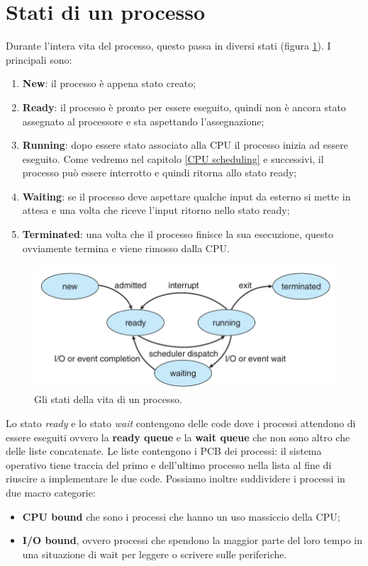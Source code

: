 \section{Stati di un processo}
Durante l'intera vita del processo, questo passa in diversi stati (figura \ref{fig:process_life}). I principali sono:
\vspace{-5px}
\begin{enumerate}
\setlength{\itemsep}{-.15 em}
    \item \textbf{New}: il processo è appena stato creato;
    \item  \textbf{Ready}: il processo è pronto per essere eseguito, quindi non è ancora stato assegnato al processore e sta aspettando l'assegnazione;
    \item \textbf{Running}: dopo essere stato associato alla CPU il processo inizia ad essere eseguito. Come vedremo nel capitolo \ref{CPU scheduling} e successivi, il processo può essere interrotto e quindi ritorna allo stato ready;
    \item \textbf{Waiting}: se il processo deve aspettare qualche input da esterno si mette in attesa e una volta che riceve l'input ritorno nello stato ready;
    \item \textbf{Terminated}: una volta che il processo finisce la sua esecuzione, questo ovviamente termina e viene rimosso dalla CPU.
\end{enumerate}
\begin{figure}[h]
    \centering
    \includegraphics[width = .75\textwidth]{../res/imgs/processes/process_life.png}
    \caption{Gli stati della vita di un processo.}
    \label{fig:process_life}
\end{figure}

\noindent Lo stato \textit{ready} e lo stato \textit{wait} contengono delle code dove i processi attendono di essere eseguiti ovvero la \textbf{ready queue} e la \textbf{wait queue} che non sono altro che delle liste concatenate. Le liste contengono i PCB dei processi: il sistema operativo tiene traccia del primo e dell'ultimo processo nella lista al fine di riuscire a implementare le due code.  Possiamo inoltre suddividere i processi in due macro categorie:
\vspace{-5px}
\begin{itemize}
\setlength{\itemsep}{-.15 em}
    \item \textbf{CPU bound} che sono i processi che hanno un uso massiccio della CPU;
    \item \textbf{I/O bound}, ovvero processi che spendono la maggior parte del loro tempo in una situazione di wait per leggere o scrivere sulle periferiche.
\end{itemize}

